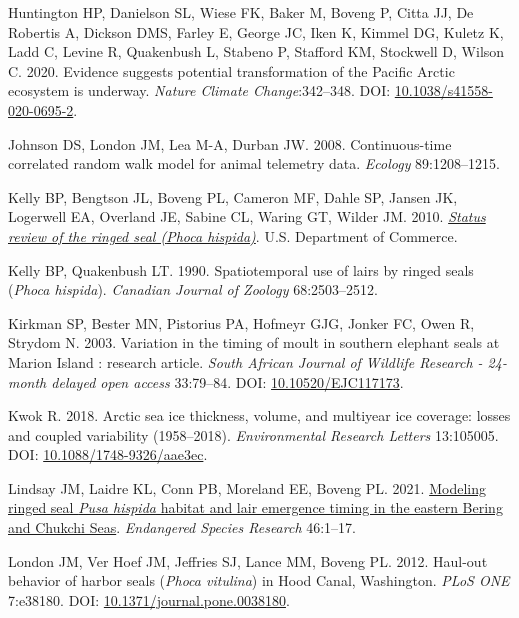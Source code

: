 \documentclass[fleqn,10pt,lineno]{wlpeerj} %
\newlength{\cslhangindent}
\newlength{\cslentryspacingunit} %
\newenvironment{CSLReferences}[2] %
 {%
  \setlength{\parindent}{0pt}
  \ifodd #1
  \let\oldpar\par
  \def\par{\hangindent=\cslhangindent\oldpar}
  \fi
  \setlength{\parskip}{#2\cslentryspacingunit}
 }%
 {}
\begin{document}
\begin{CSLReferences}{1}{0}
\leavevmode{}%
Huntington HP, Danielson SL, Wiese FK, Baker M, Boveng P, Citta JJ, De Robertis A, Dickson DMS, Farley E, George JC, Iken K, Kimmel DG, Kuletz K, Ladd C, Levine R, Quakenbush L, Stabeno P, Stafford KM, Stockwell D, Wilson C. 2020. Evidence suggests potential transformation of the Pacific Arctic ecosystem is underway. \emph{Nature Climate Change}:342--348. DOI: \href{https://doi.org/10.1038/s41558-020-0695-2}{10.1038/s41558-020-0695-2}.

\leavevmode{}%
Johnson DS, London JM, Lea M-A, Durban JW. 2008. Continuous-time correlated random walk model for animal telemetry data. \emph{Ecology} 89:1208--1215.

\leavevmode{}%
Kelly BP, Bengtson JL, Boveng PL, Cameron MF, Dahle SP, Jansen JK, Logerwell EA, Overland JE, Sabine CL, Waring GT, Wilder JM. 2010. \emph{\href{https://repository.library.noaa.gov/view/noaa/3762}{Status review of the ringed seal (\emph{Phoca hispida})}}. U.S. Department of Commerce.

\leavevmode{}%
Kelly BP, Quakenbush LT. 1990. Spatiotemporal use of lairs by ringed seals (\emph{Phoca hispida}). \emph{Canadian Journal of Zoology} 68:2503--2512.

\leavevmode{}%
Kirkman SP, Bester MN, Pistorius PA, Hofmeyr GJG, Jonker FC, Owen R, Strydom N. 2003. Variation in the timing of moult in southern elephant seals at Marion Island : research article. \emph{South African Journal of Wildlife Research - 24-month delayed open access} 33:79--84. DOI: \href{https://doi.org/10.10520/EJC117173}{10.10520/EJC117173}.

\leavevmode{}%
Kwok R. 2018. Arctic sea ice thickness, volume, and multiyear ice coverage: losses and coupled variability (1958--2018). \emph{Environmental Research Letters} 13:105005. DOI: \href{https://doi.org/10.1088/1748-9326/aae3ec}{10.1088/1748-9326/aae3ec}.

\leavevmode{}%
Lindsay JM, Laidre KL, Conn PB, Moreland EE, Boveng PL. 2021. \href{https://www.int-res.com/abstracts/esr/v46/p1-17/}{Modeling ringed seal \emph{Pusa hispida} habitat and lair emergence timing in the eastern Bering and Chukchi Seas}. \emph{Endangered Species Research} 46:1--17.

\leavevmode{}%
London JM, Ver Hoef JM, Jeffries SJ, Lance MM, Boveng PL. 2012. Haul-out behavior of harbor seals (\emph{Phoca vitulina}) in Hood Canal, Washington. \emph{PLoS ONE} 7:e38180. DOI: \href{https://doi.org/10.1371/journal.pone.0038180}{10.1371/journal.pone.0038180}.


\end{CSLReferences}
\end{document}
